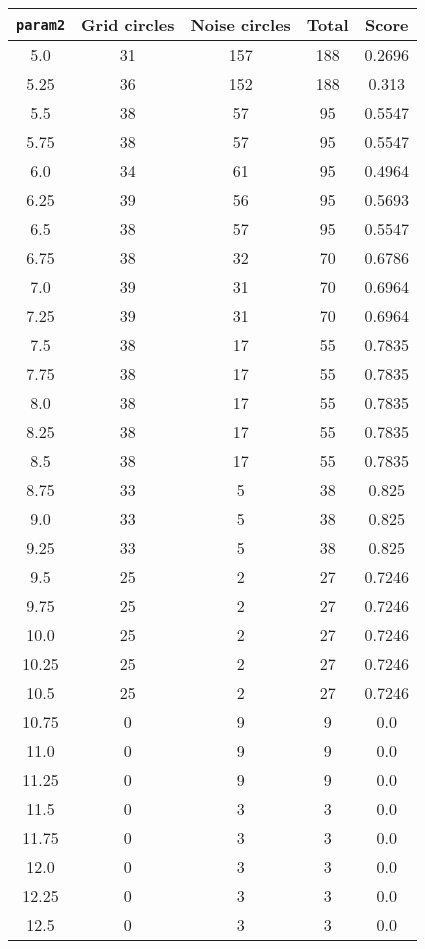\documentclass[letterpaper, 12pt]{article}
\begin{document}
\begin{longtable}{|c|c|c|c|c|}
\hline
\textbf{\texttt{param2}} & \textbf{Grid circles} & \textbf{Noise circles} & \textbf{Total} & \textbf{Score} \\
\hline
5.0 & 31 & 157 & 188 & 0.2696 \\
\hline
5.25 & 36 & 152 & 188 & 0.313 \\
\hline
5.5 & 38 & 57 & 95 & 0.5547 \\
\hline
5.75 & 38 & 57 & 95 & 0.5547 \\
\hline
6.0 & 34 & 61 & 95 & 0.4964 \\
\hline
6.25 & 39 & 56 & 95 & 0.5693 \\
\hline
6.5 & 38 & 57 & 95 & 0.5547 \\
\hline
6.75 & 38 & 32 & 70 & 0.6786 \\
\hline
7.0 & 39 & 31 & 70 & 0.6964 \\
\hline
7.25 & 39 & 31 & 70 & 0.6964 \\
\hline
7.5 & 38 & 17 & 55 & 0.7835 \\
\hline
7.75 & 38 & 17 & 55 & 0.7835 \\
\hline
8.0 & 38 & 17 & 55 & 0.7835 \\
\hline
8.25 & 38 & 17 & 55 & 0.7835 \\
\hline
8.5 & 38 & 17 & 55 & 0.7835 \\
\hline
8.75 & 33 & 5 & 38 & 0.825 \\
\hline
9.0 & 33 & 5 & 38 & 0.825 \\
\hline
9.25 & 33 & 5 & 38 & 0.825 \\
\hline
9.5 & 25 & 2 & 27 & 0.7246 \\
\hline
9.75 & 25 & 2 & 27 & 0.7246 \\
\hline
10.0 & 25 & 2 & 27 & 0.7246 \\
\hline
10.25 & 25 & 2 & 27 & 0.7246 \\
\hline
10.5 & 25 & 2 & 27 & 0.7246 \\
\hline
10.75 & 0 & 9 & 9 & 0.0 \\
\hline
11.0 & 0 & 9 & 9 & 0.0 \\
\hline
11.25 & 0 & 9 & 9 & 0.0 \\
\hline
11.5 & 0 & 3 & 3 & 0.0 \\
\hline
11.75 & 0 & 3 & 3 & 0.0 \\
\hline
12.0 & 0 & 3 & 3 & 0.0 \\
\hline
12.25 & 0 & 3 & 3 & 0.0 \\
\hline
12.5 & 0 & 3 & 3 & 0.0 \\

\end{longtable}
\end{document}
